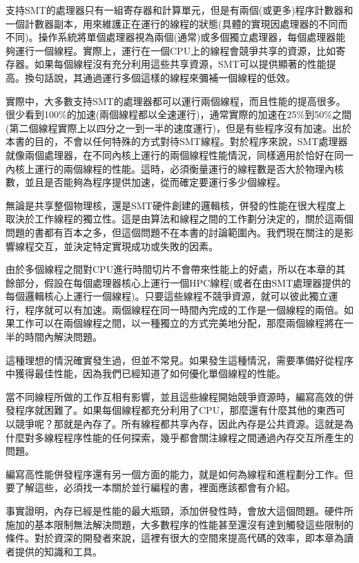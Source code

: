 支持SMT的處理器只有一組寄存器和計算單元，但是有兩個(或更多)程序計數器和一個計數器副本，用來維護正在運行的線程的狀態(具體的實現因處理器的不同而不同)。操作系統將單個處理器視為兩個(通常)或多個獨立處理器，每個處理器能夠運行一個線程。實際上，運行在一個CPU上的線程會競爭共享的資源，比如寄存器。如果每個線程沒有充分利用這些共享資源，SMT可以提供顯著的性能提高。換句話說，其通過運行多個這樣的線程來彌補一個線程的低效。

實際中，大多數支持SMT的處理器都可以運行兩個線程，而且性能的提高很多。很少看到100\%的加速(兩個線程都以全速運行)，通常實際的加速在25\%到50\%之間(第二個線程實際上以四分之一到一半的速度運行)，但是有些程序沒有加速。出於本書的目的，不會以任何特殊的方式對待SMT線程。對於程序來說，SMT處理器就像兩個處理器，在不同內核上運行的兩個線程性能情況，同樣適用於恰好在同一內核上運行的兩個線程的性能。這時，必須衡量運行的線程數是否大於物理內核數，並且是否能夠為程序提供加速，從而確定要運行多少個線程。

無論是共享整個物理核，還是SMT硬件創建的邏輯核，併發的性能在很大程度上取決於工作線程的獨立性。這是由算法和線程之間的工作劃分決定的，關於這兩個問題的書都有百本之多，但這個問題不在本書的討論範圍內。我們現在關注的是影響線程交互，並決定特定實現成功或失敗的因素。


由於多個線程之間對CPU進行時間切片不會帶來性能上的好處，所以在本章的其餘部分，假設在每個處理器核心上運行一個HPC線程(或者在由SMT處理器提供的每個邏輯核心上運行一個線程)。只要這些線程不競爭資源，就可以彼此獨立運行，程序就可以有加速。兩個線程在同一時間內完成的工作是一個線程的兩倍。如果工作可以在兩個線程之間，以一種獨立的方式完美地分配，那麼兩個線程將在一半的時間內解決問題。

這種理想的情況確實發生過，但並不常見。如果發生這種情況，需要準備好從程序中獲得最佳性能，因為我們已經知道了如何優化單個線程的性能。

當不同線程所做的工作互相有影響，並且這些線程開始競爭資源時，編寫高效的併發程序就困難了。如果每個線程都充分利用了CPU，那麼還有什麼其他的東西可以競爭呢？那就是內存了。所有線程都共享內存，因此內存是公共資源。這就是為什麼對多線程程序性能的任何探索，幾乎都會關注線程之間通過內存交互所產生的問題。

編寫高性能併發程序還有另一個方面的能力，就是如何為線程和進程劃分工作。但要了解這些，必須找一本關於並行編程的書，裡面應該都會有介紹。

事實證明，內存已經是性能的最大瓶頸，添加併發性時，會放大這個問題。硬件所施加的基本限制無法解決問題，大多數程序的性能甚至還沒有達到觸發這些限制的條件。對於資深的開發者來說，這裡有很大的空間來提高代碼的效率，即本章為讀者提供的知識和工具。


